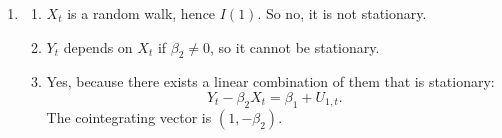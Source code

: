 \documentclass[11pt, a4paper]{article}
\begin{document}
\begin{enumerate}
\begin{enumerate}

\end{enumerate}
\item \begin{enumerate}
\item $X_t$ is a random walk, hence $I(1)$. So no, it is not stationary.
\item $Y_t$ depends on $X_t$ if $\beta_2\neq 0$, so it cannot be stationary.
\item Yes, because there exists a linear combination of them that is stationary:
\[
Y_t-\beta_2X_t=\beta_1 +U_{1,t}.
\]
The cointegrating vector is $(1, -\beta_2)$.



\end{enumerate}
\end{enumerate}
\end{document}
